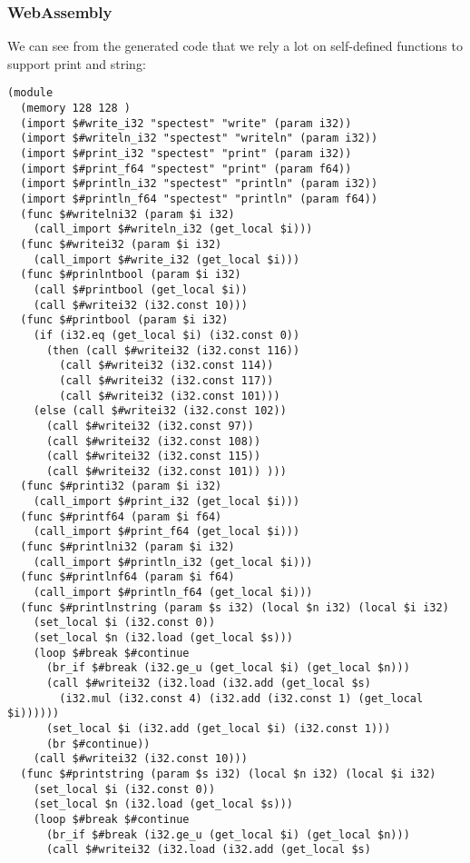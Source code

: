\documentclass{article}
\begin{document}
\subsubsection*{WebAssembly}
We can see from the generated code that we rely a lot on self-defined functions to support print and string:

\begin{lstlisting}
(module
  (memory 128 128 )
  (import $#write_i32 "spectest" "write" (param i32))
  (import $#writeln_i32 "spectest" "writeln" (param i32))
  (import $#print_i32 "spectest" "print" (param i32))
  (import $#print_f64 "spectest" "print" (param f64))
  (import $#println_i32 "spectest" "println" (param i32))
  (import $#println_f64 "spectest" "println" (param f64))
  (func $#writelni32 (param $i i32)
    (call_import $#writeln_i32 (get_local $i)))
  (func $#writei32 (param $i i32)
    (call_import $#write_i32 (get_local $i)))
  (func $#prinlntbool (param $i i32)
    (call $#printbool (get_local $i))
    (call $#writei32 (i32.const 10)))
  (func $#printbool (param $i i32)
    (if (i32.eq (get_local $i) (i32.const 0))
      (then (call $#writei32 (i32.const 116))
        (call $#writei32 (i32.const 114))
        (call $#writei32 (i32.const 117))
        (call $#writei32 (i32.const 101)))
    (else (call $#writei32 (i32.const 102))
      (call $#writei32 (i32.const 97))
      (call $#writei32 (i32.const 108))
      (call $#writei32 (i32.const 115))
      (call $#writei32 (i32.const 101)) )))
  (func $#printi32 (param $i i32)
    (call_import $#print_i32 (get_local $i)))
  (func $#printf64 (param $i f64)
    (call_import $#print_f64 (get_local $i)))
  (func $#printlni32 (param $i i32)
    (call_import $#println_i32 (get_local $i)))
  (func $#printlnf64 (param $i f64)
    (call_import $#println_f64 (get_local $i)))
  (func $#printlnstring (param $s i32) (local $n i32) (local $i i32)
    (set_local $i (i32.const 0))
    (set_local $n (i32.load (get_local $s)))
    (loop $#break $#continue
      (br_if $#break (i32.ge_u (get_local $i) (get_local $n)))
      (call $#writei32 (i32.load (i32.add (get_local $s)
        (i32.mul (i32.const 4) (i32.add (i32.const 1) (get_local $i))))))
      (set_local $i (i32.add (get_local $i) (i32.const 1)))
      (br $#continue))
    (call $#writei32 (i32.const 10)))
  (func $#printstring (param $s i32) (local $n i32) (local $i i32)
    (set_local $i (i32.const 0))
    (set_local $n (i32.load (get_local $s)))
    (loop $#break $#continue
      (br_if $#break (i32.ge_u (get_local $i) (get_local $n)))
      (call $#writei32 (i32.load (i32.add (get_local $s)

\end{lstlisting}
\end{document}
